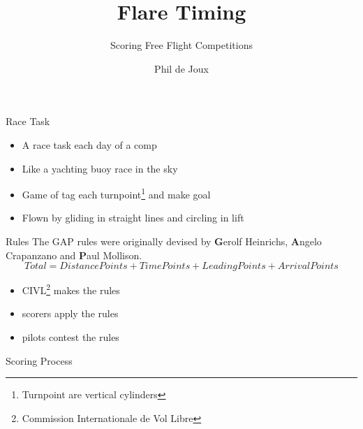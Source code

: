 \documentclass{beamer}
\title{Flare Timing}
\subtitle{Scoring Free Flight Competitions}
\author{Phil de Joux}
\institute{Block Scope}
\date{}
\begin{document}
\begin{frame}
\titlepage
\end{frame}

\begin{frame}{Race Task}
\begin{itemize}
    \item A race task each day of a comp
    \item Like a yachting buoy race in the sky
    \item Game of tag each turnpoint\footnote{Turnpoint are vertical cylinders} and make goal
    \item Flown by gliding in straight lines and circling in lift
\end{itemize}
\end{frame}


\begin{frame}{Rules}
The GAP rules were originally devised by \textbf{G}erolf Heinrichs, \textbf{A}ngelo Crapanzano and \textbf{P}aul Mollison.
\[ Total = DistancePoints + TimePoints + LeadingPoints + ArrivalPoints \]
    
\begin{itemize}
    \item CIVL\footnote{Commission Internationale de Vol Libre} makes the rules
    \item scorers apply the rules
    \item pilots contest the rules
\end{itemize}
\end{frame}

\begin{frame}{Scoring Process}
\begin{figure}[!ht]
    \centering
    
    \label{fig:scoring-process}
\end{figure}
\end{frame}
\end{document}
